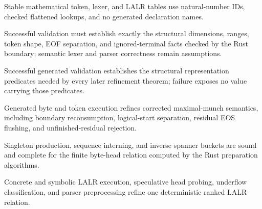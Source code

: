 \begin{definition}
  \label{def:normalized-table-spec}
  Stable mathematical token, lexer, and LALR tables use natural-number IDs,
  checked flattened lookups, and no generated declaration names.
\end{definition}

\begin{definition}
  \label{def:validated-representation}
  Successful validation must establish exactly the structural dimensions,
  ranges, token shape, EOF separation, and ignored-terminal facts checked by
  the Rust boundary; semantic lexer and parser correctness remain assumptions.
\end{definition}

\begin{theorem}
  \label{thm:validation-boundary}
  \leanok
  Successful generated validation establishes the structural representation
  predicates needed by every later refinement theorem; failure exposes no
  value carrying those predicates.
\end{theorem}

\begin{theorem}
  \label{thm:lexer-token-refinement}
  \notready
  Generated byte and token execution refines corrected maximal-munch semantics,
  including boundary reconsumption, logical-start separation, residual EOS
  flushing, and unfinished-residual rejection.
\end{theorem}

\begin{theorem}
  \label{thm:spanner-refinement}
  \notready
  Singleton production, sequence interning, and inverse spanner buckets are
  sound and complete for the finite byte-head relation computed by the Rust
  preparation algorithms.
\end{theorem}

\begin{theorem}
  \label{thm:lalr-preprocess-refinement}
  \notready
  Concrete and symbolic LALR execution, speculative head probing, underflow
  classification, and parser preprocessing refine one deterministic ranked
  LALR relation.
\end{theorem}

